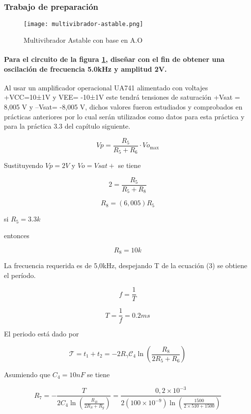 \subsubsection{Trabajo de preparación}

\begin{figure}[ht]
    \centering
    \texttt{[image: multivibrador-astable.png]}
    \caption{Multivibrador Astable con base en A.O}
    \label{fig:multivibrador-astable}
\end{figure}

\paragraph{Para el circuito de la figura \ref{fig:multivibrador-astable}, diseñar con el fin de obtener una oscilación de frecuencia 5.0kHz y amplitud 2V.\\}

Al usar un amplificador operacional UA741 alimentado con voltajes +VCC=10±1V y                     VEE= -10±1V este tendrá tensiones de saturación +Vsat = 8,005 V y –Vsat= -8,005 V, dichos valores fueron estudiados y comprobados en prácticas anteriores por lo cual serán utilizados como datos para esta práctica y para la práctica 3.3 del capítulo siguiente. 

\begin{equation}
    Vp = \frac{R_5}{R_5 + R_6} \cdot Vo_{\text{max}}
\end{equation}

Sustituyendo $Vp= 2V$ y $Vo = Vsat+$ se tiene

$$
2 = \frac{R_5}{R_5 + R_8}
$$

$$ R_8 = (6,005)R_5$$

si $R_5 = 3.3k $

entonces 

$$ R_8 = 10k$$


La frecuencia requerida es de 5,0kHz, despejando T de la ecuación (3) se obtiene el período.

$$ f = \frac{1}{T} $$


$$ T = \frac{1}{f} = 0.2ms$$

El periodo está dado por

\[
\mathcal{T} = t_1 + t_2 = - 2 R_\gamma \mathcal{C}_4 \ln \left( \frac{R_8}{2 R_5 + R_6} \right)
\]

Asumiendo que $C_4 = 10nF$ se tiene

\[
R_7 = - \frac{T}{2C_4 \ln \left( \frac{R_B}{2R_S + R_g} \right)} = \frac{0,2 \times 10^{-3}}{2 (100 \times 10^{-9}) \ln \left( \frac{1500}{2 \times 510 + 1500} \right)}
\]

